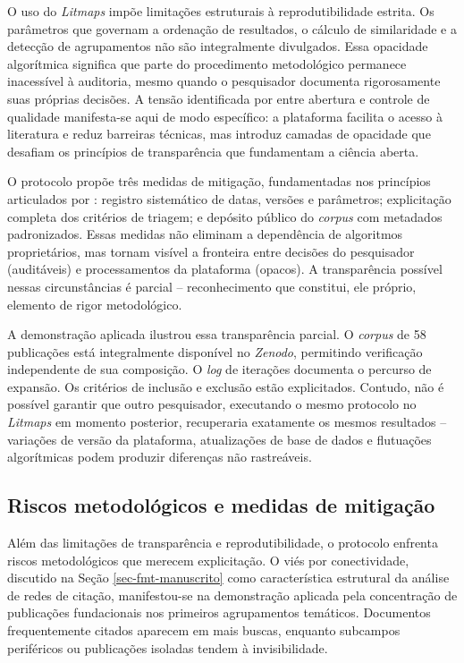\documentclass[portuguese]{textolivre}
\begin{document}
	O uso do \textit{Litmaps} impõe limitações estruturais à reprodutibilidade estrita. Os parâmetros que governam a ordenação de resultados, o cálculo de similaridade e a detecção de agrupamentos não são integralmente divulgados. Essa opacidade algorítmica significa que parte do procedimento metodológico permanece inacessível à auditoria, mesmo quando o pesquisador documenta rigorosamente suas próprias decisões. A tensão identificada por \textcite{Quintanilha2019} entre abertura e controle de qualidade manifesta-se aqui de modo específico: a plataforma facilita o acesso à literatura e reduz barreiras técnicas, mas introduz camadas de opacidade que desafiam os princípios de transparência que fundamentam a ciência aberta.
    
	O protocolo propõe três medidas de mitigação, fundamentadas nos princípios articulados por \textcite{Munafo2017}: registro sistemático de datas, versões e parâmetros; explicitação completa dos critérios de triagem; e depósito público do \textit{corpus} com metadados padronizados. Essas medidas não eliminam a dependência de algoritmos proprietários, mas tornam visível a fronteira entre decisões do pesquisador (auditáveis) e processamentos da plataforma (opacos). A transparência possível nessas circunstâncias é parcial – reconhecimento que constitui, ele próprio, elemento de rigor metodológico.
    
	A demonstração aplicada ilustrou essa transparência parcial. O \textit{corpus} de 58 publicações está integralmente disponível no \textit{Zenodo}, permitindo verificação independente de sua composição. O \textit{log} de iterações documenta o percurso de expansão. Os critérios de inclusão e exclusão estão explicitados. Contudo, não é possível garantir que outro pesquisador, executando o mesmo protocolo no \textit{Litmaps} em momento posterior, recuperaria exatamente os mesmos resultados – variações de versão da plataforma, atualizações de base de dados e flutuações algorítmicas podem produzir diferenças não rastreáveis.



\subsection{Riscos metodológicos e medidas de mitigação}\label{sec-figuras-tabelas}
Além das limitações de transparência e reprodutibilidade, o protocolo enfrenta riscos metodológicos que merecem explicitação. O viés por conectividade, discutido na Seção \ref{sec-fmt-manuscrito} como característica estrutural da análise de redes de citação, manifestou-se na demonstração aplicada pela concentração de publicações fundacionais nos primeiros agrupamentos temáticos. Documentos frequentemente citados aparecem em mais buscas, enquanto subcampos periféricos ou publicações isoladas tendem à invisibilidade.
\end{document}
